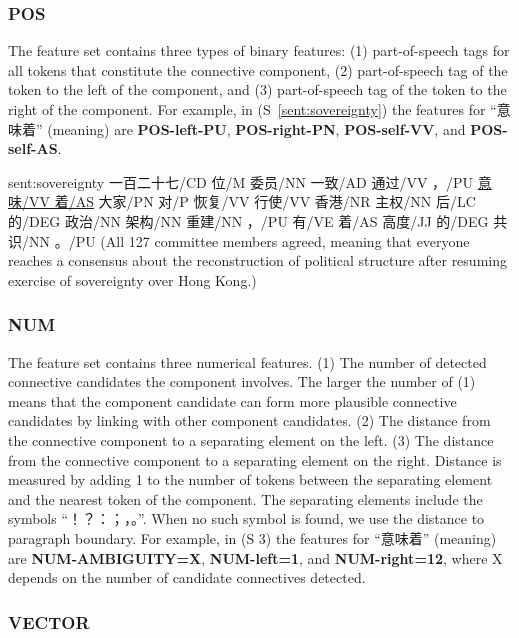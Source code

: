 

\subsubsection{POS}

The feature set contains three types of binary features:
(1) part-of-speech tags for all tokens that constitute the connective component,
(2) part-of-speech tag of the token to the left of the component, and
(3) part-of-speech tag of the token to the right of the component. For example,
in (S~\ref{sent:sovereignty}) the features for ``意味着'' (meaning) are
\textbf{POS-left-PU}, \textbf{POS-right-PN}, \textbf{POS-self-VV}, and
\textbf{POS-self-AS}.

\begin{sent}{sent:sovereignty}{}
    一百二十七/CD 位/M 委员/NN 一致/AD 通过/VV ，/PU \underline{意味/VV 着/AS} 大家/PN 对/P
    恢复/VV 行使/VV 香港/NR 主权/NN 后/LC 的/DEG 政治/NN 架构/NN 重建/NN ，/PU
    有/VE 着/AS 高度/JJ 的/DEG 共识/NN 。/PU
    (All 127 committee members agreed, meaning that everyone reaches a consensus about
    the reconstruction of political structure after resuming exercise of sovereignty over Hong Kong.)
\end{sent}

\subsubsection{NUM}

The feature set contains three numerical features. (1) The number of detected
connective candidates the component involves. The larger the number of (1) means that
the component candidate can form more plausible connective candidates by linking with
other component candidates. (2) The distance from the connective component
to a separating element on the left. (3) The distance from the connective component to a
separating element on the right. Distance is measured by adding 1 to the number of tokens
between the separating element and the nearest token of the component.
The separating elements include the symbols ``！？：；，。''.
When no such symbol is found, we use the distance to paragraph boundary.
For example, in (S 3) the features for “意味着” (meaning) are \textbf{NUM-AMBIGUITY=X},
\textbf{NUM-left=1}, and \textbf{NUM-right=12}, where X depends on the number of candidate
connectives detected.


\subsubsection{VECTOR}

